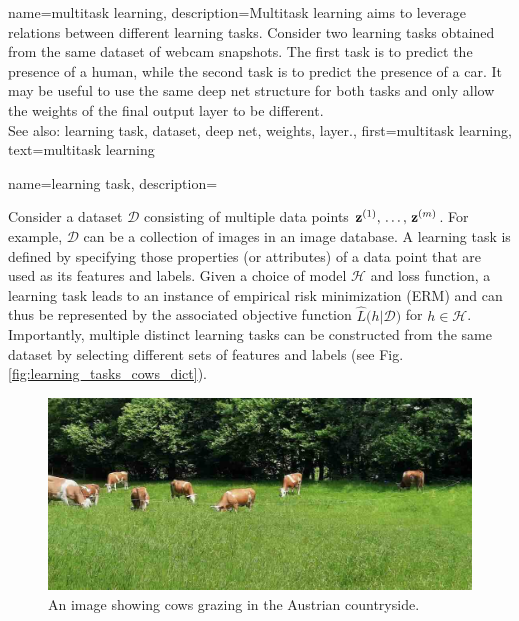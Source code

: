 {
{name={multitask learning},
	description={Multitask learning aims to leverage relations between 
	 	different learning tasks. Consider two learning tasks obtained from the 
	 	same dataset of webcam snapshots. The first task is to predict the presence 
	 	of a human, while the second task is to predict the presence of a car. It may be useful 
	 	to use the same deep net structure for both tasks and only allow the weights of 
	 	the final output layer to be different.
	 			\\ 
		See also: learning task, dataset, deep net, weights, layer.},
	first={multitask learning},
	text={multitask learning}
}

{name={learning task},
	description={Consider a dataset $\mathcal{D}$ consisting of 
		multiple data points ${\bf z}^{(1)},\,\ldots,\,{\bf z}^{(m)}$. 
		For example, $\mathcal{D}$ can be a collection of images in an image database. 
		A learning task is defined by specifying those properties (or attributes) of a data point 
		that are used as its features and labels. Given a choice of model $\mathcal{H}$ and 
		loss function, a learning task leads to an instance of empirical risk minimization (ERM) and can thus be 
		represented by the associated objective function $\widehat{L}\big(h|\mathcal{D}\big)$ for $h \in \mathcal{H}$. 
		Importantly, multiple distinct learning tasks can be constructed from the same dataset 
		by selecting different sets of features and labels (see Fig. \ref{fig:learning_tasks_cows_dict}).
    		\begin{figure}[H]
			\centering
			
			\begin{minipage}[t]{0.95\textwidth}
    			\centering
    			\includegraphics[width=\textwidth]{assets/CowsAustria.jpg}
    			\caption*{An image showing cows grazing in the Austrian countryside.}
			\vspace{5mm}
			\end{minipage}
			\vspace{5mm}
			

\end{figure}}}}
